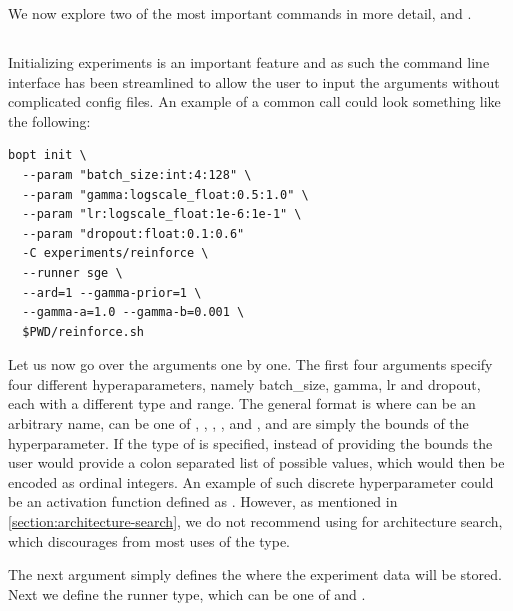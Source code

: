 We now explore two of the most important commands in more detail,  and .

\subsection{}

Initializing experiments is an important feature and as such the command line interface has been streamlined to allow the user to input the arguments without complicated config files. An example of a common  call could look something like the following:

\begin{center}
\begin{verbatim}
bopt init \
  --param "batch_size:int:4:128" \
  --param "gamma:logscale_float:0.5:1.0" \
  --param "lr:logscale_float:1e-6:1e-1" \
  --param "dropout:float:0.1:0.6"
  -C experiments/reinforce \
  --runner sge \
  --ard=1 --gamma-prior=1 \
  --gamma-a=1.0 --gamma-b=0.001 \
  $PWD/reinforce.sh
\end{verbatim}	
\end{center}


Let us now go over the arguments one by one. The first four arguments specify four different hyperaparameters, namely batch\_size, gamma, lr and dropout, each with a different type and range. The general format is  where  can be an arbitrary name,  can be one of , , , , and , and  are simply the bounds of the hyperparameter. If the type of  is specified, instead of providing the bounds the user would provide a colon separated list of possible values, which would then be encoded as ordinal integers. An example of such discrete hyperparameter could be an activation function defined as . However, as mentioned in \autoref{section:architecture-search}, we do not recommend using \bopt for architecture search, which discourages from most uses of the  type.

The next argument  simply defines the  where the experiment data will be stored. Next we define the runner type, which can be one of  and .

